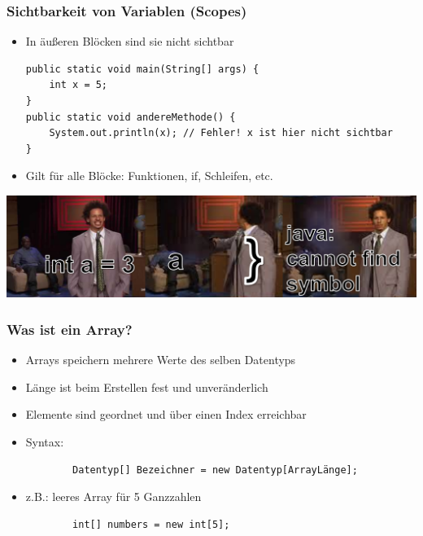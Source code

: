 \documentclass{../../presentation}
\begin{document}
\begin{frame}[fragile]
	\frametitle{Sichtbarkeit von Variablen (Scopes)}
	\begin{itemize}
		\item\pause In äußeren Blöcken sind sie nicht sichtbar
		      \begin{verbatim}
public static void main(String[] args) {
    int x = 5;
}
public static void andereMethode() {
    System.out.println(x); // Fehler! x ist hier nicht sichtbar
}
    \end{verbatim}

		\item\pause Gilt für alle Blöcke: Funktionen, if, Schleifen, etc.
	\end{itemize}
	\includegraphics[width=1\linewidth]{img/scopesmemehoriz.png}
\end{frame}


\begin{frame}[fragile]
	\frametitle{Was ist ein Array?}
	\begin{itemize}
		\item\pause Arrays speichern mehrere Werte des selben Datentyps
		\item\pause Länge ist beim Erstellen fest und unveränderlich
		\item\pause Elemente sind geordnet und über einen Index erreichbar
		\item\pause Syntax:
		      \begin{verbatim}
        Datentyp[] Bezeichner = new Datentyp[ArrayLänge];
    \end{verbatim}
		\item\pause z.B.: leeres Array für 5 Ganzzahlen
		      \begin{verbatim}
		int[] numbers = new int[5];
	\end{verbatim}
	\end{itemize}
\end{frame}
\end{document}
